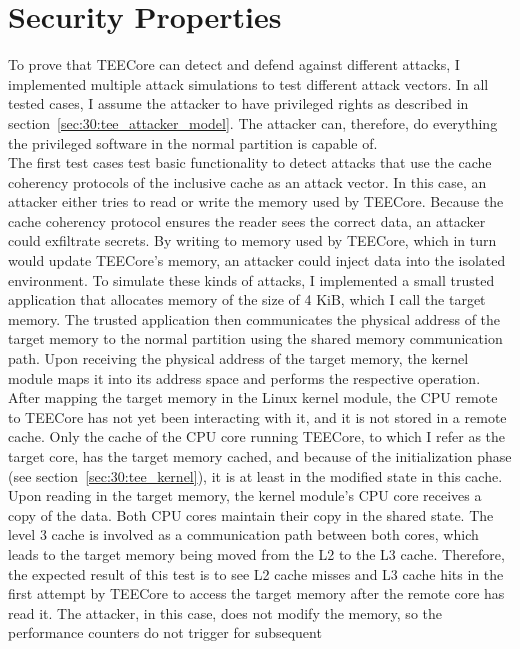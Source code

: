 \section{Security Properties}
To prove that TEECore can detect and defend against different attacks, I
implemented multiple attack simulations to test different attack vectors. In all
tested cases, I assume the attacker to have privileged rights as described in
section~\ref{sec:30:tee_attacker_model}. The attacker can, therefore, do
everything the privileged software in the normal partition is capable of.\\

The first test cases test basic functionality to detect attacks that use the
cache coherency protocols of the inclusive cache as an attack vector. In this
case, an attacker either tries to read or write the memory used by TEECore.
Because the cache coherency protocol ensures the reader sees the correct data,
an attacker could exfiltrate secrets. By writing to memory used by TEECore,
which in turn would update TEECore's memory, an attacker could inject data into
the isolated environment. To simulate these kinds of attacks, I implemented a
small trusted application that allocates memory of the size of 4 KiB, which I
call the target memory. The trusted application then communicates the physical
address of the target memory to the normal partition using the shared memory
communication path. Upon receiving the physical address of the target memory,
the kernel module maps it into its address space and performs the respective
operation. After mapping the target memory in the Linux kernel module, the CPU
remote to TEECore has not yet been interacting with it, and it is not stored in
a remote cache. Only the cache of the CPU core running TEECore, to which I refer
as the target core, has the target memory cached, and because of the
initialization phase (see section~\ref{sec:30:tee_kernel}), it is at least in
the modified state in this cache. Upon reading in the target memory, the kernel
module's CPU core receives a copy of the data. Both CPU cores maintain their
copy in the shared state. The level 3 cache is involved as a communication path
between both cores, which leads to the target memory being moved from the L2 to
the L3 cache. Therefore, the expected result of this test is to see L2 cache
misses and L3 cache hits in the first attempt by TEECore to access the target
memory after the remote core has read it. The attacker, in this case, does not
modify the memory, so the performance counters do not trigger for subsequent
